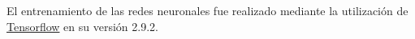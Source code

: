 \begin{appendixs}
    El entrenamiento de las redes neuronales fue realizado mediante la utilización de \href{https://www.tensorflow.org}{Tensorflow} en su versión 2.9.2. 

  
    

    
    
    
    
    
    

    
    
\end{appendixs}